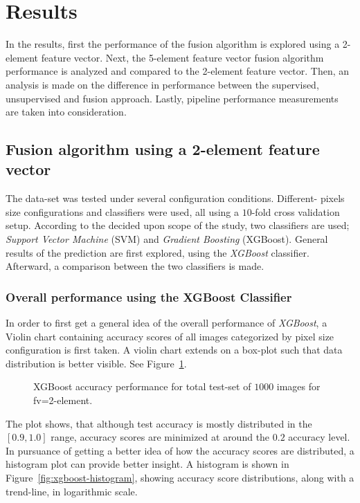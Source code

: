 
\section{Results}\label{sec:results}
In the results, first the performance of the fusion algorithm is explored using a 2-element feature vector. Next, the 5-element feature vector fusion algorithm performance is analyzed and compared to the 2-element feature vector. Then, an analysis is made on the difference in performance between the supervised, unsupervised and fusion approach. Lastly, pipeline performance measurements are taken into consideration.

\subsection{Fusion algorithm using a 2-element feature vector}\label{sec:results_2-elem-fv}
The data-set was tested under several configuration conditions. Different- pixels size configurations and classifiers were used, all using a $10$-fold cross validation setup. According to the decided upon scope of the study, two classifiers are used; \textit{Support Vector Machine} (SVM) and \textit{Gradient Boosting} (XGBoost). General results of the prediction are first explored, using the \textit{XGBoost} classifier. Afterward, a comparison between the two classifiers is made.

\subsubsection{Overall performance using the XGBoost Classifier}
In order to first get a general idea of the overall performance of \textit{XGBoost}, a Violin chart containing accuracy scores of all images categorized by pixel size configuration is first taken. A violin chart extends on a box-plot such that data distribution is better visible. See Figure~\ref{fig:xgboost-violinplot}.

\begin{figure}[ht]
  \centering
  
  \caption{XGBoost accuracy performance for total test-set of $1000$ images for fv=2-element.
  }\label{fig:xgboost-violinplot}
\end{figure}

The plot shows, that although test accuracy is mostly distributed in the $[0.9, 1.0]$ range, accuracy scores are minimized at around the $0.2$ accuracy level. In pursuance of getting a better idea of how the accuracy scores are distributed, a histogram plot can provide better insight. A histogram is shown in Figure~\ref{fig:xgboost-histogram}, showing accuracy score distributions, along with a trend-line, in logarithmic scale.

